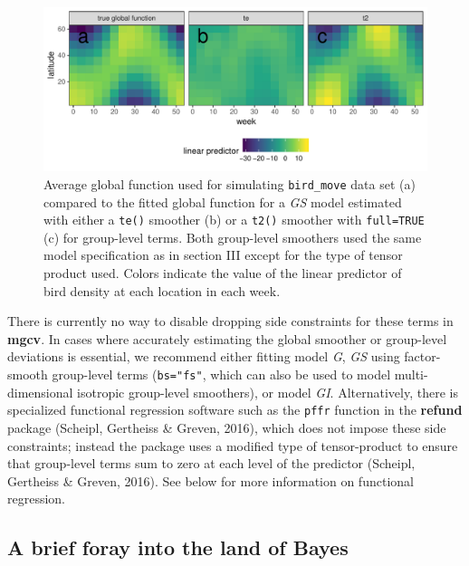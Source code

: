 \documentclass[12pt]{article}
\begin{document}
\begin{figure}
\centering
\includegraphics{../figures/Fig20.pdf}
\caption{\label{fig:Fig20}Average global function used for simulating
\texttt{bird\_move} data set (a) compared to the fitted global function
for a \emph{GS} model estimated with either a \texttt{te()} smoother (b)
or a \texttt{t2()} smoother with \texttt{full=TRUE} (c) for group-level
terms. Both group-level smoothers used the same model specification as
in section III except for the type of tensor product used. Colors
indicate the value of the linear predictor of bird density at each
location in each week.}
\end{figure}

There is currently no way to disable dropping side constraints for these
terms in \textbf{mgcv}. In cases where accurately estimating the global
smoother or group-level deviations is essential, we recommend either
fitting model \emph{G}, \emph{GS} using factor-smooth group-level terms
(\texttt{bs="fs"}, which can also be used to model multi-dimensional
isotropic group-level smoothers), or model \emph{GI}. Alternatively,
there is specialized functional regression software such as the
\texttt{pffr} function in the \textbf{refund} package (Scheipl,
Gertheiss \& Greven, 2016), which does not impose these side
constraints; instead the package uses a modified type of tensor-product
to ensure that group-level terms sum to zero at each level of the
predictor (Scheipl, Gertheiss \& Greven, 2016). See below for more
information on functional regression.

\subsection{A brief foray into the land of
Bayes}\label{a-brief-foray-into-the-land-of-bayes}
\end{document}
